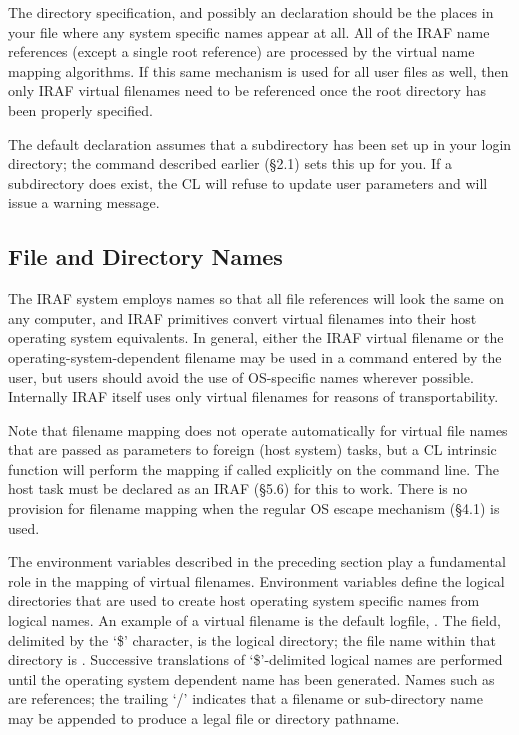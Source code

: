 
\noindent
The  directory specification, and possibly an 
 declaration should be the  places in
your  file where any system specific names appear
at all.  All of the IRAF name references (except a single root reference)
are processed by the virtual name mapping algorithms. If this same
mechanism is used for all user files as well, then only IRAF
virtual filenames need to be referenced once the root directory
has been properly specified.

The default  declaration
assumes that a 
subdirectory has been set up in your login directory; the 
command described earlier (\S 2.1) sets this up for you. If a 
subdirectory does  exist, the CL will refuse to update
user parameters and will issue a warning message.

\subsection{File and Directory Names}

\ppind
The IRAF system employs  names so that all file
references will look the same on any computer, and IRAF primitives convert 
virtual filenames into their host operating system equivalents.  In general,
either the IRAF virtual filename or the operating-system-dependent filename
may be used in a command entered by the user, but users should avoid
the use of OS-specific names wherever possible.  Internally IRAF itself 
uses only virtual filenames for reasons of transportability.

Note that filename mapping does not operate automatically for virtual file
names that are passed as parameters to foreign (host system) tasks, but a CL
intrinsic function  will perform the mapping if called
explicitly on the command line.  The host task must be declared as an IRAF
 (\S 5.6) for this to work.  There is no provision
for filename mapping when the regular OS escape mechanism (\S 4.1) is used.

The environment variables described in the preceding section play a fundamental
role in the mapping of virtual filenames.  Environment variables define 
the logical directories that are used to create host operating system
specific names from logical names. An example of a virtual filename
is the default logfile, . 
The  field, delimited by the `\$' character, is the logical
directory; the file name within that directory is .
Successive translations of `\$'-delimited logical names are performed until the
operating system dependent name has been generated.  Names such as 
 are  references; the trailing `/'
indicates that a filename or sub-directory name may be appended to produce
a legal file or directory pathname.

